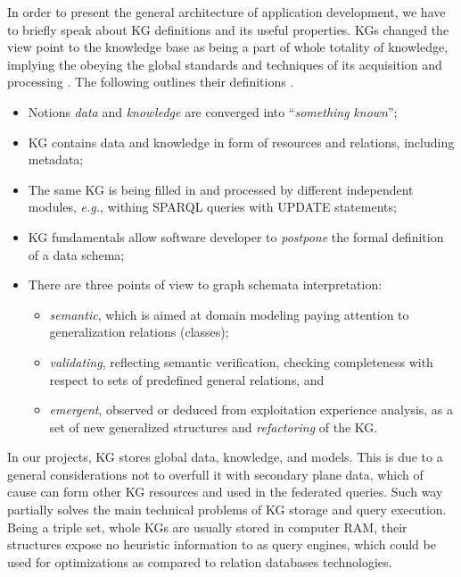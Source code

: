 \documentclass[
]{ceurart}
\begin{document}
In order to present the general architecture of application development, we have to briefly speak about KG definitions and its useful properties.
KGs changed the view point to the knowledge base as being a part of whole totality of knowledge, implying the obeying the global standards and techniques of its acquisition and processing \cite{hogan}.  The following outlines their definitions \cite{hogan}.
 \begin{itemize}
  \item Notions \emph{data} and \emph{knowledge} are converged into ``\emph{something} \emph{known}'';
  \item KG contains data and knowledge in form of resources and relations, including metadata;
  \item The same KG is being filled in and processed by different independent modules, \emph{e.g.}, withing SPARQL queries with UPDATE statements;
  \item KG fundamentals allow software developer to \emph{postpone} the formal definition of a data schema;
  \item There are three points of view to graph schemata interpretation:
    \begin{itemize}
    \item \emph{semantic}, which is aimed at domain modeling paying attention to generalization relations (classes);
    \item \emph{validating}, reflecting semantic verification, checking completeness with respect to sets of predefined general relations, and
    \item \emph{emergent}, observed or deduced from exploitation experience analysis, as a set of new generalized structures and \emph{refactoring} of the KG.
    \end{itemize}
  \end{itemize}

In our projects, KG stores global data, knowledge, and models.  This is due to a general considerations not to overfull it with secondary plane data, which of cause can form other KG resources and used in the federated queries.  Such way partially solves the main technical problems of KG storage and query execution.  Being a triple set, whole KGs are usually stored in computer RAM, their structures expose no heuristic information to as query engines, which could be used for optimizations as compared to relation databases technologies.
\end{document}
